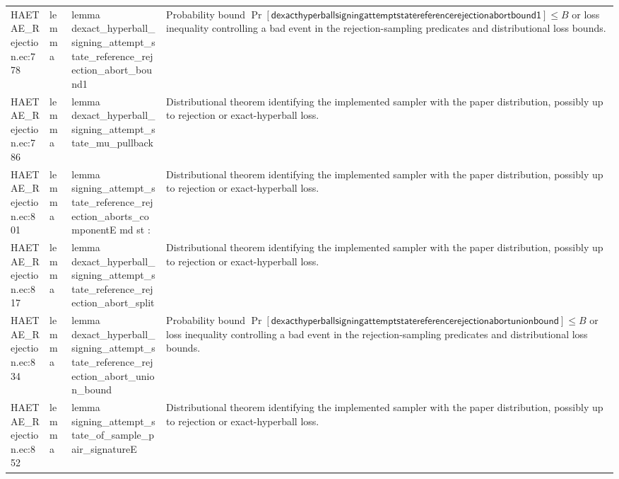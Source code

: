 \documentclass[10pt]{article}
\begin{document}
\begin{longtable}{L{0.11\textwidth}L{0.055\textwidth}L{0.385\textwidth}L{0.41\textwidth}}
HAETAE\_\allowbreak{}Rejection.\allowbreak{}ec:\allowbreak{}778 & lemma & {\ttfamily\scriptsize lemma dexact\_\allowbreak{}hyperball\_\allowbreak{}signing\_\allowbreak{}attempt\_\allowbreak{}state\_\allowbreak{}reference\_\allowbreak{}rejection\_\allowbreak{}abort\_\allowbreak{}bound1} & Probability bound $\Pr[\mathsf{dexacthyperballsigningattemptstatereferencerejectionabortbound1}]\le B$ or loss inequality controlling a bad event in the rejection-sampling predicates and distributional loss bounds. \\
HAETAE\_\allowbreak{}Rejection.\allowbreak{}ec:\allowbreak{}786 & lemma & {\ttfamily\scriptsize lemma dexact\_\allowbreak{}hyperball\_\allowbreak{}signing\_\allowbreak{}attempt\_\allowbreak{}state\_\allowbreak{}mu\_\allowbreak{}pullback} & Distributional theorem identifying the implemented sampler with the paper distribution, possibly up to rejection or exact-hyperball loss. \\
HAETAE\_\allowbreak{}Rejection.\allowbreak{}ec:\allowbreak{}801 & lemma & {\ttfamily\scriptsize lemma signing\_\allowbreak{}attempt\_\allowbreak{}state\_\allowbreak{}reference\_\allowbreak{}rejection\_\allowbreak{}aborts\_\allowbreak{}componentE md st :} & Distributional theorem identifying the implemented sampler with the paper distribution, possibly up to rejection or exact-hyperball loss. \\
HAETAE\_\allowbreak{}Rejection.\allowbreak{}ec:\allowbreak{}817 & lemma & {\ttfamily\scriptsize lemma dexact\_\allowbreak{}hyperball\_\allowbreak{}signing\_\allowbreak{}attempt\_\allowbreak{}state\_\allowbreak{}reference\_\allowbreak{}rejection\_\allowbreak{}abort\_\allowbreak{}split} & Distributional theorem identifying the implemented sampler with the paper distribution, possibly up to rejection or exact-hyperball loss. \\
HAETAE\_\allowbreak{}Rejection.\allowbreak{}ec:\allowbreak{}834 & lemma & {\ttfamily\scriptsize lemma dexact\_\allowbreak{}hyperball\_\allowbreak{}signing\_\allowbreak{}attempt\_\allowbreak{}state\_\allowbreak{}reference\_\allowbreak{}rejection\_\allowbreak{}abort\_\allowbreak{}union\_\allowbreak{}bound} & Probability bound $\Pr[\mathsf{dexacthyperballsigningattemptstatereferencerejectionabortunionbound}]\le B$ or loss inequality controlling a bad event in the rejection-sampling predicates and distributional loss bounds. \\
HAETAE\_\allowbreak{}Rejection.\allowbreak{}ec:\allowbreak{}852 & lemma & {\ttfamily\scriptsize lemma signing\_\allowbreak{}attempt\_\allowbreak{}state\_\allowbreak{}of\_\allowbreak{}sample\_\allowbreak{}pair\_\allowbreak{}signatureE} & Distributional theorem identifying the implemented sampler with the paper distribution, possibly up to rejection or exact-hyperball loss. \\

\end{longtable}
\end{document}
